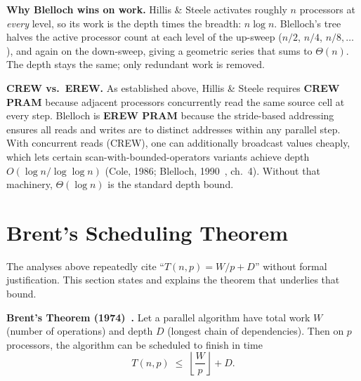 \begin{ppkey}
\textbf{Why Blelloch wins on work.} Hillis \& Steele activates roughly
$n$ processors at \emph{every} level, so its work is the depth times the
breadth: $n \log n$. Blelloch's tree halves the active processor count
at each level of the up-sweep ($n/2$, $n/4$, $n/8, \ldots$), and again
on the down-sweep, giving a geometric series that sums to $\Theta(n)$.
The depth stays the same; only redundant work is removed.
\end{ppkey}

\begin{ppnote}
\textbf{CREW vs.\ EREW.} As established above, Hillis \& Steele requires
\textbf{CREW PRAM} because adjacent processors concurrently read the same
source cell at every step. Blelloch is \textbf{EREW PRAM} because the
stride-based addressing ensures all reads and writes are to distinct
addresses within any parallel step. With concurrent reads (CREW), one can
additionally broadcast values cheaply, which lets certain
scan-with-bounded-operators variants achieve depth
$O(\log n / \log\log n)$ (Cole, 1986; Blelloch, 1990~\cite{blelloch1990}, ch.~4). Without
that machinery, $\Theta(\log n)$ is the standard depth bound.
\end{ppnote}

\section{Brent's Scheduling Theorem}
\label{sec:brents-theorem}

The analyses above repeatedly cite ``$T(n,p) = W/p + D$'' without formal
justification. This section states and explains the theorem that underlies
that bound.

\begin{ppkey}
\textbf{Brent's Theorem (1974)~\cite{brent1974}.} Let a parallel algorithm have total work
$W$ (number of operations) and depth $D$ (longest chain of dependencies).
Then on $p$ processors, the algorithm can be scheduled to finish in time
\[
T(n,p) \;\le\; \left\lfloor \frac{W}{p} \right\rfloor + D.
\]
\end{ppkey}

